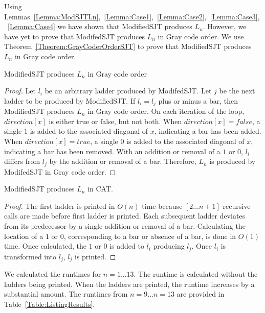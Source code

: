 Using Lemmas~\ref{Lemma:ModSJTLn},~\ref{Lemma:Case1},~\ref{Lemma:Case2},~\ref{Lemma:Case3},~\ref{Lemma:Case4} we have shown that 
{\sc ModifiedSJT} produces $L_{n}$. However, we have yet to prove that {\sc ModifedSJT} produces $L_{n}$ in Gray code order. 
We use Theorem~\ref{Theorem:GrayCoderOrderSJT} to prove that {\sc ModifiedSJT} produces $L_{n}$ in Gray code order. 
\begin{theorem}
  {\sc ModifiedSJT} produces $L_{n}$ in Gray code order
  \label{Theorem:GrayCoderOrderSJT}
\end{theorem}
\begin{proof}
  Let $l_{i}$ be an arbitrary ladder produced by {\sc ModifedSJT}. Let $j$ be the next ladder to be produced by {\sc ModifiedSJT}. If 
  $l_{i}=l_{j}$ plus or minus a bar, then {\sc ModifiedSJT} produces $L_{n}$ in Gray code order. On each iteration of the loop, $direction[x]$ 
  is either true or false, but not both. When $direction[x]=false$, a single $1$ is added to the associated diagonal of $x$, indicating 
  a bar has been added. When $direction[x]=true$, 
  a single $0$ is added to the associated diagonal of $x$, indicating a bar has been removed. With an addition or removal of a $1$ or $0$, $l_{i}$ 
  differs from $l_{j}$ by the addition or removal of a bar. Therefore, $L_{n}$ is produced by {\sc ModifedSJT} in Gray code order.
    
\end{proof}
\begin{theorem}
  {\sc ModifiedSJT} produces $L_{n}$ in CAT.
\end{theorem}
\begin{proof}
  The first ladder is printed in $O(n)$ time because $[2 \dots n+1]$ recursive calls are made 
before first ladder is printed. Each subsequent ladder deviates from its predecessor by a single addition or removal of a bar.
  Calculating the location of a $1$ or $0$, corresponding to a bar or absence of a bar, is done in $O(1)$ time. Once calculated, 
  the $1$ or $0$ is added to $l_{i}$ producing $l_{j}$. Once $l_{i}$ is transformed into $l_{j}$, $l_{j}$ is printed.
\end{proof}
We calculated the runtimes for $n=1 \dots 13$. The runtime is calculated without the ladders being printed.  
When the ladders are printed, the runtime increases by a substantial amount. 
The runtimes from $n=9 \dots n=13$ are provided in Table~\ref{Table:ListingResults}.
